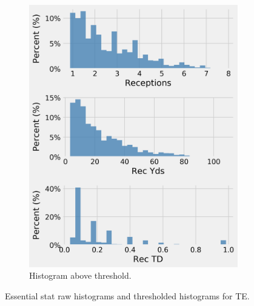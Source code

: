 \documentclass[12pt]{article}
\begin{document}
\begin{figure}[H]
\begin{subfigure}[b]{0.450\textwidth}
    \includegraphics[width=1\textwidth]{../figures/threshold_hist_TE}
    \caption{Histogram above threshold.}
  \end{subfigure}
  \caption{Essential stat raw histograms and thresholded histograms for TE.}
\end{figure}
\end{document}
